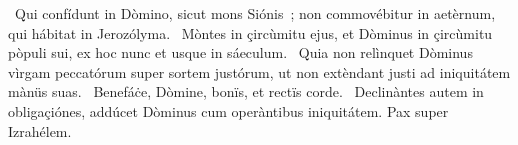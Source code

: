 \psalmChapterWithInscription{}
{ }
{%
~Qui confídunt in Dòmino, sicut mons Siónis~; non commovébitur in aetèrnum, qui hábitat in Jerozólyma. 
~Mòntes in çircùmitu ejus, et Dòminus in çircùmitu pòpuli sui, ex hoc nunc et usque in sáeculum. 
~Quia non relìnquet Dòminus vìrgam peccatórum super sortem justórum, ut non extèndant justi ad iniquitátem mànüs suas. 
~Benefáċe, Dòmine, bonïs, et rectïs corde. 
~Declinàntes autem in obligaçiónes, addúcet Dòminus cum operàntibus iniquitátem. Pax super Izrahélem. 
}
